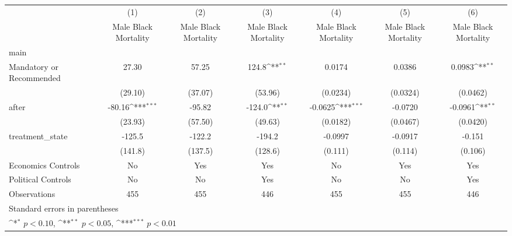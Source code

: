 {
\def\sym#1{\ifmmode^{#1}\else\(^{#1}\)\fi}
\begin{longtable}{l*{6}{c}}
\hline\hline\endfirsthead\hline\endhead\hline\endfoot\endlastfoot
                    &\multicolumn{1}{c}{(1)}&\multicolumn{1}{c}{(2)}&\multicolumn{1}{c}{(3)}&\multicolumn{1}{c}{(4)}&\multicolumn{1}{c}{(5)}&\multicolumn{1}{c}{(6)}\\
                    &\multicolumn{1}{c}{Male Black Mortality}&\multicolumn{1}{c}{Male Black Mortality}&\multicolumn{1}{c}{Male Black Mortality}&\multicolumn{1}{c}{Male Black Mortality}&\multicolumn{1}{c}{Male Black Mortality}&\multicolumn{1}{c}{Male Black Mortality}\\
\hline
main                &                     &                     &                     &                     &                     &                     \\
Mandatory or Recommended&       27.30         &       57.25         &       124.8\sym{**} &      0.0174         &      0.0386         &      0.0983\sym{**} \\
                    &     (29.10)         &     (37.07)         &     (53.96)         &    (0.0234)         &    (0.0324)         &    (0.0462)         \\
[1em]
after               &      -80.16\sym{***}&      -95.82         &      -124.0\sym{**} &     -0.0625\sym{***}&     -0.0720         &     -0.0961\sym{**} \\
                    &     (23.93)         &     (57.50)         &     (49.63)         &    (0.0182)         &    (0.0467)         &    (0.0420)         \\
[1em]
treatment\_state     &      -125.5         &      -122.2         &      -194.2         &     -0.0997         &     -0.0917         &      -0.151         \\
                    &     (141.8)         &     (137.5)         &     (128.6)         &     (0.111)         &     (0.114)         &     (0.106)         \\
[1em]
Economics Controls  &          No         &         Yes         &         Yes         &          No         &         Yes         &         Yes         \\
[1em]
Political Controls  &          No         &          No         &         Yes         &          No         &          No         &         Yes         \\
\hline
Observations        &         455         &         455         &         446         &         455         &         455         &         446         \\
\hline\hline
\multicolumn{7}{l}{\footnotesize Standard errors in parentheses}\\
\multicolumn{7}{l}{\footnotesize \sym{*} \(p<0.10\), \sym{**} \(p<0.05\), \sym{***} \(p<0.01\)}\\
\end{longtable}
}
